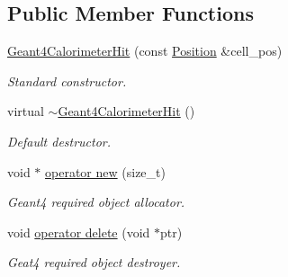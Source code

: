 \subsection*{Public Member Functions}
\begin{DoxyCompactItemize}
\item 
\hyperlink{class_d_d4hep_1_1_simulation_1_1_geant4_calorimeter_hit_abbd57e0eab3a707b644a29c32006228c}{Geant4\+Calorimeter\+Hit} (const \hyperlink{namespace_d_d4hep_1_1_geometry_a55083902099d03506c6db01b80404900}{Position} \&cell\+\_\+pos)
\begin{DoxyCompactList}\small\item\em Standard constructor. \end{DoxyCompactList}\item 
virtual \hyperlink{class_d_d4hep_1_1_simulation_1_1_geant4_calorimeter_hit_aa1c4edd85a2375d70f7cfc135f17b9cb}{$\sim$\+Geant4\+Calorimeter\+Hit} ()
\begin{DoxyCompactList}\small\item\em Default destructor. \end{DoxyCompactList}\item 
void $\ast$ \hyperlink{class_d_d4hep_1_1_simulation_1_1_geant4_calorimeter_hit_a2f0811576b3d642d15805d87a096f598}{operator new} (size\+\_\+t)
\begin{DoxyCompactList}\small\item\em Geant4 required object allocator. \end{DoxyCompactList}\item 
void \hyperlink{class_d_d4hep_1_1_simulation_1_1_geant4_calorimeter_hit_a974038503b2e2fa0d988b802ad5c29e2}{operator delete} (void $\ast$ptr)
\begin{DoxyCompactList}\small\item\em Geat4 required object destroyer. \end{DoxyCompactList}\end{DoxyCompactItemize}
